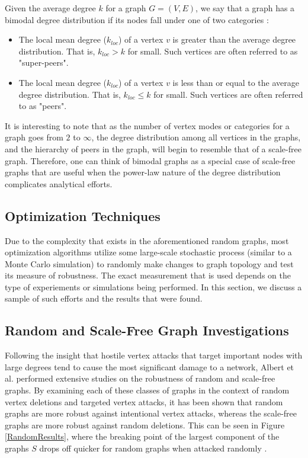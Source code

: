 \documentclass[doc]{apa}%
\begin{document}
Given the average degree $k$ for a graph $G = (V,E)$, we say that a graph has a bimodal degree distribution if its nodes fall under one of two categories \cite{bimodal}:
\begin{itemize}
	\item The local mean degree ($k_{loc}$) of a vertex $v$ is greater than the average degree distribution. That is, $k_{loc} > k$ for small. Such vertices are often referred to as "super-peers".
	\item The local mean degree ($k_{loc}$) of a vertex $v$ is less than or equal to the average degree distribution. That is, $k_{loc} \leq k$ for small. Such vertices are often referred to as "peers".
\end{itemize}
It is interesting to note that as the number of vertex modes or categories for a graph goes from $2$ to $\infty$, the degree distribution among all vertices in the graphs, and the hierarchy of peers in the graph, will begin to resemble that of a scale-free graph. Therefore, one can think of bimodal graphs as a special case of scale-free graphs that are useful when the power-law nature of the degree distribution complicates analytical efforts.

\subsection{Optimization Techniques}
Due to the complexity that exists in the aforementioned random graphs, most optimization algorithms utilize some large-scale stochastic process (similar to a Monte Carlo simulation) to randomly make changes to graph topology and test its measure of robustness. The exact measurement that is used depends on the type of experiements or simulations being performed. In this section, we discuss a sample of such efforts and the results that were found.

\subsection{Random and Scale-Free Graph Investigations}


Following the insight that hostile vertex attacks that target important nodes with large degrees tend to cause the most significant damage to a network, Albert et al. performed extensive studies on the robustness of random and scale-free graphs. By examining each of these classes of graphs in the context of random vertex deletions and targeted vertex attacks, it has been shown that random graphs are more robust against intentional vertex attacks, whereas the scale-free graphs are more robust against random deletions. This can be seen in Figure \ref{RandomResults}, where the breaking point of the largest component of the graphs $S$ drops off quicker for random graphs when attacked randomly \cite{GraphThesis}. 
\end{document}
